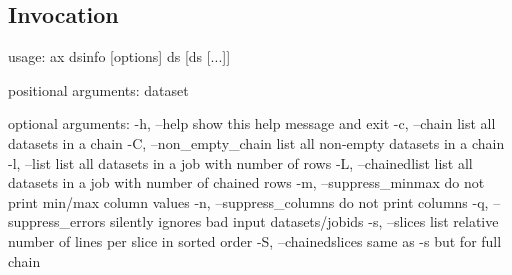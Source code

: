 \subsection{Invocation}
\begin{shell}
  usage: ax dsinfo [options] ds [ds [...]]

  positional arguments:
  dataset

  optional arguments:
  -h, --help              show this help message and exit
  -c, --chain             list all datasets in a chain
  -C, --non_empty_chain   list all non-empty datasets in a chain
  -l, --list              list all datasets in a job with number of rows
  -L, --chainedlist       list all datasets in a job with number of chained rows
  -m, --suppress_minmax   do not print min/max column values
  -n, --suppress_columns  do not print columns
  -q, --suppress_errors   silently ignores bad input datasets/jobids
  -s, --slices            list relative number of lines per slice in sorted
  order
  -S, --chainedslices     same as -s but for full chain
\end{shell}

